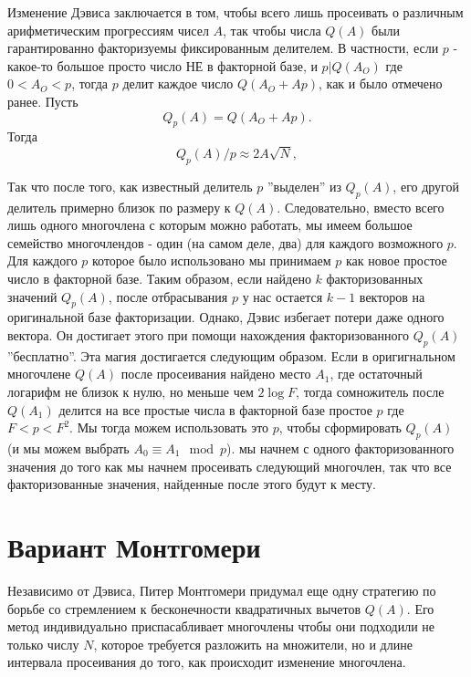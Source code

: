 \documentclass[a4paper,12pt]{report}
\begin{document}
Изменение Дэвиса заключается в том, чтобы всего лишь просеивать о различным арифметическим прогрессиям чисел $A$, так чтобы числа $Q(A)$ были гарантированно факторизуемы фиксированным делителем. В частности, если $p$ - какое-то большое просто число НЕ в факторной базе, и $p | Q(A_O)$ где $0 < A_O < p$, тогда $p$ делит каждое число $Q(A_O + Ap)$, как и было отмечено ранее. Пусть
\begin{equation*}
Q_p(A) = Q(A_O + Ap).
\end{equation*}
Тогда
\begin{equation*}
Q_p(A)/p \approx 2A\sqrt{N},
\end{equation*}

Так что после того, как известный делитель $p$ ''выделен'' из $Q_p(A)$, его другой делитель примерно близок по размеру к $Q(A)$. Следовательно, вместо всего лишь одного многочлена с которым можно работать, мы имеем большое семейство многочлендов - один (на самом деле, два) для каждого возможного $p$. Для каждого $p$ которое было использовано мы принимаем $p$ как новое простое число в факторной базе. Таким образом, если найдено $k$ факторизованных значений $Q_p(A)$, после отбрасывания $p$ у нас остается $k-1$ векторов на оригинальной базе факторизации. Однако, Дэвис избегает потери даже одного вектора. Он достигает этого при помощи нахождения факторизованного $Q_p(A)$ ''бесплатно''. Эта магия достигается следующим образом. Если в оригигнальном многочлене $Q(A)$ после просеивания найдено место $A_1$, где остаточный логарифм не близок к нулю, но меньше чем $2 \log{F}$, тогда сомножитель после $Q(A_1)$ делится на все простые числа в факторной базе простое $p$ где $F < p < F^2$. Мы тогда можем использовать это $p$, чтобы сформировать $Q_p(A)$ (и мы можем выбрать $A_0 \equiv A_1 \mod p$). мы начнем с одного факторизованного значения до того как мы начнем просеивать следующий многочлен, так что все факторизованные значения, найденные после этого будут к месту.

\section{Вариант Монтгомери}

Независимо от Дэвиса, Питер Монтгомери \cite{mont} придумал еще одну стратегию по борьбе со стремлением к бесконечности квадратичных вычетов $Q(A)$. Его метод индивидуально приспасабливает многочлены чтобы они подходили не только числу $N$, которое требуется разложить на множители, но и длине интервала просеивания до того, как происходит изменение многочлена.
\end{document}
